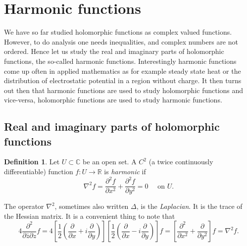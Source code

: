 \documentclass[12pt,openany]{book}
\newcommand{\C}{{\mathbb{C}}}
\newcommand{\R}{{\mathbb{R}}}
\newcommand{\myindex}[1]{#1\index{#1}}
\theoremstyle{plain}
\theoremstyle{remark}
\theoremstyle{definition}
\newtheorem{defn}[thm]{Definition}
\theoremstyle{exercise}
\theoremstyle{example}
\begin{document}

\section{Harmonic functions}
\label{sec:harmonic}

We have so far studied holomorphic functions as complex valued functions.
However, to do analysis one needs inequalities, and complex numbers are not
ordered.  Hence let us study the real and imaginary parts of holomorphic
functions, the so-called harmonic functions.  Interestingly harmonic
functions come up often in applied mathematics as for example steady state
heat or the distribution of electrostatic potential in a region without
charge.  It then turns out then that harmonic functions are used to study
holomorphic functions and vice-versa, holomorphic functions are used to
study harmonic functions.

\subsection{Real and imaginary parts of holomorphic functions}

\begin{defn}
Let $U \subset \C$ be an open set.
A $C^2$ (a twice continuously differentiable) function $f \colon U \to \R$ is
\emph{\myindex{harmonic}} if
\begin{equation*}
\nabla^2 f =
\frac{\partial^2 f}{\partial x^2} +
\frac{\partial^2 f}{\partial y^2} = 0
\quad \text{ on $U$.}
\end{equation*}
\end{defn}

The operator $\nabla^2$, sometimes also written $\Delta$,
is the \emph{\myindex{Laplacian}}.
It is the trace of the Hessian matrix.  It is a convenient thing
to note that
\begin{equation*}
4
\frac{\partial^2}{\partial \bar{z}\partial z} f =
4
\left[
\frac{1}{2}
\left(
\frac{\partial}{\partial x} + i
\frac{\partial}{\partial y}
\right)
\right]
\left[
\frac{1}{2}
\left(
\frac{\partial}{\partial x} - i
\frac{\partial}{\partial y}
\right)
\right]
f
=
\left[
\frac{\partial^2}{\partial x^2} +
\frac{\partial}{\partial y^2}
\right]
f
=
\nabla^2 f .
\end{equation*}
\end{document}
